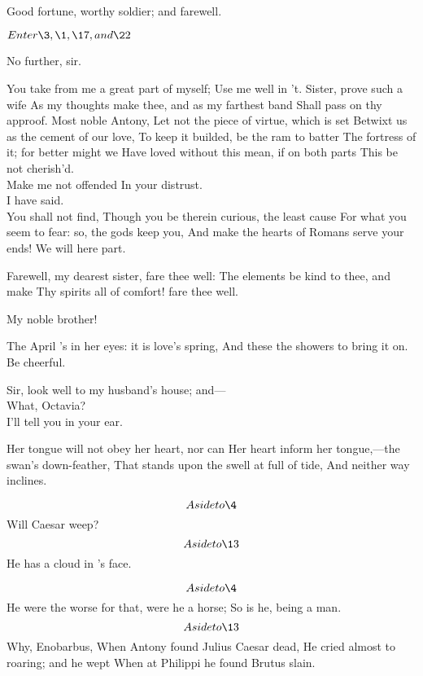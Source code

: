 \documentclass{book}
\begin{document}
\4	Good fortune, worthy soldier; and farewell.

	\(Enter \3, \1, \17, and \22\)

\1	No further, sir.

\3	You take from me a great part of myself;
	Use me well in 't. Sister, prove such a wife
	As my thoughts make thee, and as my farthest band
	Shall pass on thy approof. Most noble Antony,
	Let not the piece of virtue, which is set
	Betwixt us as the cement of our love,
	To keep it builded, be the ram to batter
	The fortress of it; for better might we
	Have loved without this mean, if on both parts
	This be not cherish'd. \\

\1	Make me not offended
	In your distrust. \\

\3	                  I have said. \\

\1	You shall not find,
	Though you be therein curious, the least cause
	For what you seem to fear: so, the gods keep you,
	And make the hearts of Romans serve your ends!
	We will here part.

\3	Farewell, my dearest sister, fare thee well:
	The elements be kind to thee, and make
	Thy spirits all of comfort! fare thee well.

	My noble brother!

\1	The April 's in her eyes: it is love's spring,
	And these the showers to bring it on. Be cheerful.

	Sir, look well to my husband's house; and--- \\

\3	What,
        Octavia? \\

	       I'll tell you in your ear.

\1	Her tongue will not obey her heart, nor can
	Her heart inform her tongue,---the swan's 	down-feather,
	That stands upon the swell at full of tide,
	And neither way inclines.

	\[Aside to \4\]  Will Caesar weep? \\

\4	\[Aside to \13\]  He has a cloud in 's face.  

	\[Aside to \4\]  He were the worse for that, were he a horse;
	So is he, being a man. \\

\4 \[Aside to \13\]  Why, Enobarbus,
	When Antony found Julius Caesar dead,
	He cried almost to roaring; and he wept
	When at Philippi he found Brutus slain.
\end{document}
